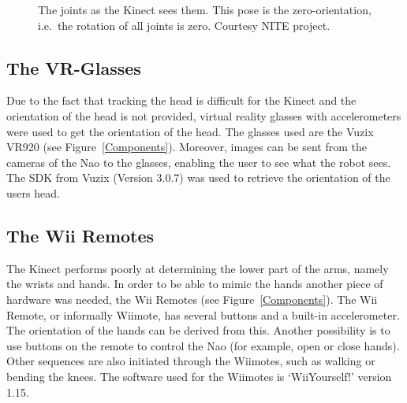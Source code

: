 \documentclass[letterpaper, 10pt, conference]{ieeeconf}
\begin{document}
\begin{figure}[htb]
\label{KinectJoints}
\caption{The joints as the Kinect sees them. This pose is the zero-orientation, i.e.\ the rotation of all joints is zero. Courtesy NITE project.}
\end{figure}

\subsection{The VR-Glasses}
Due to the fact that tracking the head is difficult for the Kinect and the orientation of the head is not provided, virtual reality glasses with accelerometers were used to get the orientation of the head. 
The glasses used are the Vuzix VR920 (see Figure~\ref{Components}). Moreover, images can be sent from the cameras of the Nao to the glasses, enabling the user to see what the robot sees. 
The SDK from Vuzix (Version 3.0.7) was used to retrieve the orientation of the users head.
\subsection{The Wii Remotes}
The Kinect performs poorly at determining the lower part of the arms, namely the wrists and hands. In order to be able to mimic the hands another piece of hardware was needed, the Wii Remotes (see Figure~\ref{Components}). The Wii Remote, or informally Wiimote, has several buttons and a built-in accelerometer. The orientation of the hands can be derived from this. Another possibility is to use buttons on the remote to control the Nao (for example, open or close hands). Other sequences are also initiated through the Wiimotes, such as walking or bending the knees.
The software used for the Wiimotes is `WiiYourself!'  version 1.15.
\end{document}
